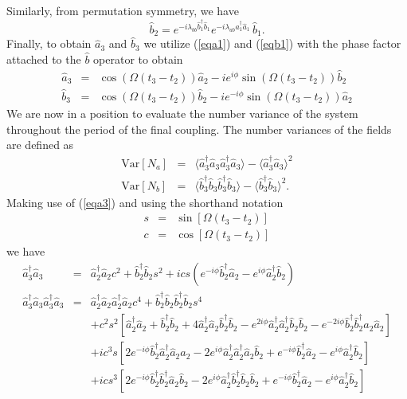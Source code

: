 \documentclass{iopart}
\begin{document}
Similarly, from permutation symmetry, we have
\begin{equation}
\hat{b}_2 = e^{-i \lambda_{bb} \hat{b}_1^{\dagger} \hat{b}_1} e^{-i \lambda_{ab} \hat{a}_1^{\dagger} \hat{a}_1} \, \hat{b}_1.     
\label{eqb2}
\end{equation}
Finally, to obtain $\hat{a}_3$ and $\hat{b}_3$ we utilize (\ref{eqa1}) and (\ref{eqb1}) with the phase factor attached to the $\hat{b}$ operator to obtain
\begin{eqnarray}
\hat{a}_3 &=& \cos (\Omega (t_3-t_2)) \hat{a}_2 -i e^{i\phi} \sin (\Omega (t_3-t_2)) \hat{b}_2 \label{eqa3} \\
\hat{b}_3 &=& \cos (\Omega (t_3-t_2)) \hat{b}_2 - i e^{-i\phi} \sin (\Omega (t_3-t_2)) \hat{a}_2 \label{eqb3}
\end{eqnarray} 
We are now in a position to evaluate the number variance of the system throughout the period of the final coupling. The number variances of the fields are defined as
\begin{eqnarray}
{\mathrm{Var}}[N_a] &=& \langle \hat{a}^{\dagger}_3 \hat{a}_3 \hat{a}^{\dagger}_3 \hat{a}_3 \rangle - \langle \hat{a}^{\dagger}_3 \hat{a}_3 \rangle ^2 \label{eqNavariance} \\
%
{\mathrm{Var}}[N_b] &=& \langle \hat{b}^{\dagger}_3 \hat{b}_3 \hat{b}^{\dagger}_3 \hat{b}_3 \rangle - \langle \hat{b}^{\dagger}_3 \hat{b}_3 \rangle ^2.
\label{eqNbvariance}
\end{eqnarray}
Making use of (\ref{eqa3}) and using the shorthand notation 
\begin{eqnarray}
s &=& \sin[\Omega (t_3 - t_2)] \\
c &=& \cos[\Omega (t_3 - t_2)]
\end{eqnarray}
we have
\begin{eqnarray}
\hat{a}^{\dagger}_3 \hat{a}_3 &=& \hat{a}^{\dagger}_2 \hat{a}_2 c^2 +  \hat{b}^{\dagger}_2 \hat{b}_2 s^2 + i c s (e^{-i \phi} \hat{b}^{\dagger}_2 \hat{a}_2 - e^{i \phi} \hat{a}^{\dagger}_2 \hat{b}_2) \\
%
%
\hat{a}^{\dagger}_3 \hat{a}_3 \hat{a}^{\dagger}_3 \hat{a}_3 &=& \hat{a}^{\dagger}_2 \hat{a}_2 \hat{a}^{\dagger}_2 \hat{a}_2 c^4 + \hat{b}^{\dagger}_2 \hat{b}_2 \hat{b}^{\dagger}_2 \hat{b}_2 s^4 \nonumber \\
%
&& + c^2 s^2 [ \hat{a}^{\dagger}_2 \hat{a}_2 + \hat{b}^{\dagger}_2 \hat{b}_2 + 4 \hat{a}^{\dagger}_2 \hat{a}_2 \hat{b}^{\dagger}_2 \hat{b}_2 -e^{2 i \phi} \hat{a}^{\dagger}_2 \hat{a}^{\dagger}_2 \hat{b}_2 \hat{b}_2 -e^{-2 i \phi} \hat{b}^{\dagger}_2 \hat{b}^{\dagger}_2 \hat{a}_2 \hat{a}_2 ] \nonumber \\
%
&& + i c^3 s [2 e^{-i \phi} \hat{b}^{\dagger}_2 \hat{a}^{\dagger}_2 \hat{a}_2 \hat{a}_2 - 2 e^{i \phi} \hat{a}^{\dagger}_2 \hat{a}^{\dagger}_2 \hat{a}_2 \hat{b}_2 + e^{-i \phi} \hat{b}^{\dagger}_2 \hat{a}_2 - e^{i \phi} \hat{a}^{\dagger}_2 \hat{b}_2 ] \nonumber \\
%
&& + i c s^3 [2 e^{-i \phi} \hat{b}^{\dagger}_2 \hat{b}^{\dagger}_2 \hat{a}_2 \hat{b}_2 - 2 e^{i \phi} \hat{a}^{\dagger}_2 \hat{b}^{\dagger}_2 \hat{b}_2 \hat{b}_2 + e^{-i \phi} \hat{b}^{\dagger}_2 \hat{a}_2 - e^{i \phi} \hat{a}^{\dagger}_2 \hat{b}_2 ]
\end{eqnarray}
\end{document}
